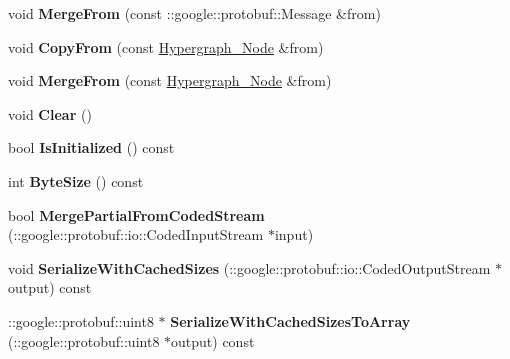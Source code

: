 \begin{DoxyCompactItemize}
\item 
\hypertarget{classHypergraph__Node_a86b37cd7bd563958a5854440ecacfd78}{
void {\bfseries MergeFrom} (const ::google::protobuf::Message \&from)}
\label{classHypergraph__Node_a86b37cd7bd563958a5854440ecacfd78}

\item 
\hypertarget{classHypergraph__Node_a7cbc530171a8036783952f6dc56c5c67}{
void {\bfseries CopyFrom} (const \hyperlink{classHypergraph__Node}{Hypergraph\_\-Node} \&from)}
\label{classHypergraph__Node_a7cbc530171a8036783952f6dc56c5c67}

\item 
\hypertarget{classHypergraph__Node_a459f2e561a40bd7fd3222b73dda89d8d}{
void {\bfseries MergeFrom} (const \hyperlink{classHypergraph__Node}{Hypergraph\_\-Node} \&from)}
\label{classHypergraph__Node_a459f2e561a40bd7fd3222b73dda89d8d}

\item 
\hypertarget{classHypergraph__Node_acc9fbbcc5ad55e598d95757849bf02d3}{
void {\bfseries Clear} ()}
\label{classHypergraph__Node_acc9fbbcc5ad55e598d95757849bf02d3}

\item 
\hypertarget{classHypergraph__Node_ade66b64dfb3992afdb22a539e093480a}{
bool {\bfseries IsInitialized} () const }
\label{classHypergraph__Node_ade66b64dfb3992afdb22a539e093480a}

\item 
\hypertarget{classHypergraph__Node_a7b0650e4259ade4af4f4199339084c9c}{
int {\bfseries ByteSize} () const }
\label{classHypergraph__Node_a7b0650e4259ade4af4f4199339084c9c}

\item 
\hypertarget{classHypergraph__Node_a1a8a82dd55ff8a347d315b1656a56c3f}{
bool {\bfseries MergePartialFromCodedStream} (::google::protobuf::io::CodedInputStream $\ast$input)}
\label{classHypergraph__Node_a1a8a82dd55ff8a347d315b1656a56c3f}

\item 
\hypertarget{classHypergraph__Node_aef948b6f1a9433485edd286239868600}{
void {\bfseries SerializeWithCachedSizes} (::google::protobuf::io::CodedOutputStream $\ast$output) const }
\label{classHypergraph__Node_aef948b6f1a9433485edd286239868600}

\item 
\hypertarget{classHypergraph__Node_a4b377b386242677d120b4845aa6561ef}{
::google::protobuf::uint8 $\ast$ {\bfseries SerializeWithCachedSizesToArray} (::google::protobuf::uint8 $\ast$output) const }
\label{classHypergraph__Node_a4b377b386242677d120b4845aa6561ef}


\end{DoxyCompactItemize}
